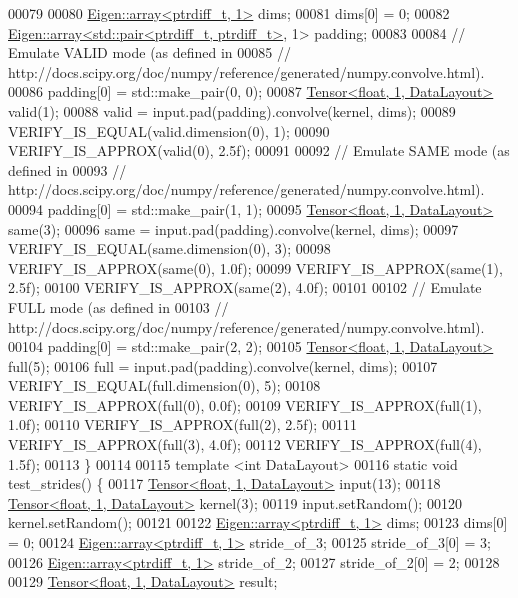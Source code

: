 \begin{DoxyCode}
00079 
00080   \hyperlink{class_eigen_1_1array}{Eigen::array<ptrdiff\_t, 1>} dims;
00081   dims[0] = 0;
00082   \hyperlink{class_eigen_1_1array}{Eigen::array<std::pair<ptrdiff\_t, ptrdiff\_t>}, 1> padding;
00083 
00084   \textcolor{comment}{// Emulate VALID mode (as defined in}
00085   \textcolor{comment}{// http://docs.scipy.org/doc/numpy/reference/generated/numpy.convolve.html).}
00086   padding[0] = std::make\_pair(0, 0);
00087   \hyperlink{class_eigen_1_1_tensor}{Tensor<float, 1, DataLayout>} valid(1);
00088   valid = input.pad(padding).convolve(kernel, dims);
00089   VERIFY\_IS\_EQUAL(valid.dimension(0), 1);
00090   VERIFY\_IS\_APPROX(valid(0), 2.5f);
00091 
00092   \textcolor{comment}{// Emulate SAME mode (as defined in}
00093   \textcolor{comment}{// http://docs.scipy.org/doc/numpy/reference/generated/numpy.convolve.html).}
00094   padding[0] = std::make\_pair(1, 1);
00095   \hyperlink{class_eigen_1_1_tensor}{Tensor<float, 1, DataLayout>} same(3);
00096   same = input.pad(padding).convolve(kernel, dims);
00097   VERIFY\_IS\_EQUAL(same.dimension(0), 3);
00098   VERIFY\_IS\_APPROX(same(0), 1.0f);
00099   VERIFY\_IS\_APPROX(same(1), 2.5f);
00100   VERIFY\_IS\_APPROX(same(2), 4.0f);
00101 
00102   \textcolor{comment}{// Emulate FULL mode (as defined in}
00103   \textcolor{comment}{// http://docs.scipy.org/doc/numpy/reference/generated/numpy.convolve.html).}
00104   padding[0] = std::make\_pair(2, 2);
00105   \hyperlink{class_eigen_1_1_tensor}{Tensor<float, 1, DataLayout>} full(5);
00106   full = input.pad(padding).convolve(kernel, dims);
00107   VERIFY\_IS\_EQUAL(full.dimension(0), 5);
00108   VERIFY\_IS\_APPROX(full(0), 0.0f);
00109   VERIFY\_IS\_APPROX(full(1), 1.0f);
00110   VERIFY\_IS\_APPROX(full(2), 2.5f);
00111   VERIFY\_IS\_APPROX(full(3), 4.0f);
00112   VERIFY\_IS\_APPROX(full(4), 1.5f);
00113 \}
00114 
00115 \textcolor{keyword}{template} <\textcolor{keywordtype}{int} DataLayout>
00116 \textcolor{keyword}{static} \textcolor{keywordtype}{void} test\_strides() \{
00117   \hyperlink{class_eigen_1_1_tensor}{Tensor<float, 1, DataLayout>} input(13);
00118   \hyperlink{class_eigen_1_1_tensor}{Tensor<float, 1, DataLayout>} kernel(3);
00119   input.setRandom();
00120   kernel.setRandom();
00121 
00122   \hyperlink{class_eigen_1_1array}{Eigen::array<ptrdiff\_t, 1>} dims;
00123   dims[0] = 0;
00124   \hyperlink{class_eigen_1_1array}{Eigen::array<ptrdiff\_t, 1>} stride\_of\_3;
00125   stride\_of\_3[0] = 3;
00126   \hyperlink{class_eigen_1_1array}{Eigen::array<ptrdiff\_t, 1>} stride\_of\_2;
00127   stride\_of\_2[0] = 2;
00128 
00129   \hyperlink{class_eigen_1_1_tensor}{Tensor<float, 1, DataLayout>} result;

\end{DoxyCode}
